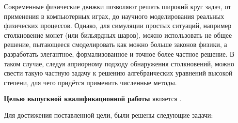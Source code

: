 
Современные физические движки позволяют решать широкий круг задач,
от применения в компьютерных играх, до научного моделирования реальных физических процессов.
Однако, для симуляции простых ситуаций, например столкновение монет (или бильярдных шаров),
можно использовать не общее решение, пытающееся смоделировать как можно больше законов физики,
а разработать элегантное, формализованное и точное более частное решение.
В таком случае, следуя априорному подходу обнаружения столкновений,
можно свести такую частную задачу к решению алгебраических уравнений высокой степени,
для чего придётся применить численные методы.

\textbf{Целью выпускной квалификационной работы} является \Target.

Для достижения поставленной цели, были решены следующие задачи:

\Tasks

\clearpage
